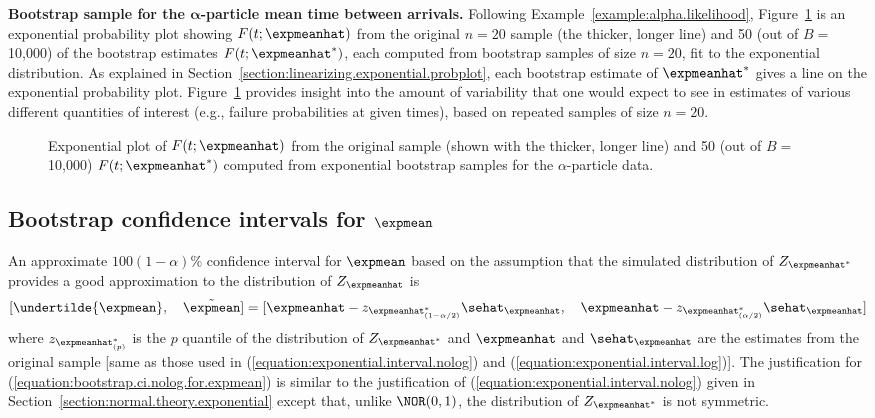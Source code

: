 \begin{example}
{\bf Bootstrap sample for the $\boldsymbol{\alpha}$-particle mean
time between arrivals.} Following
Example~\ref{example:alpha.likelihood},
Figure~\ref{figure:alpha.boot.mleprobplot.ps} is an exponential
probability plot showing $F(t;\expmeanhat)$ from the original $n=20$
sample (the thicker, longer line) and 50 (out of $B=$10,000) of the
bootstrap estimates $F(t;\expmeanhat^{*})$, each computed from
bootstrap samples of size $n=20$, fit to the exponential
distribution. As explained in
Section~\ref{section:linearizing.exponential.probplot}, each
bootstrap estimate of $\expmeanhat^{*}$ gives a line on the
exponential probability
plot. Figure~\ref{figure:alpha.boot.mleprobplot.ps} provides insight
into the amount of variability that one would expect to see in
estimates of various different quantities of interest (e.g., failure
probabilities at given times), based on repeated samples of size
$n=20$.
\end{example}
\begin{figure}
\caption{Exponential plot of $F(t;\expmeanhat)$ from 
the original sample (shown with the thicker, longer line)
and 50 (out of $B=$10,000) $F(t;\expmeanhat^{*})$
computed from exponential bootstrap samples for the $\alpha$-particle
data.}
\label{figure:alpha.boot.mleprobplot.ps}
\end{figure}

\subsection{Bootstrap confidence intervals for $\expmean$ } 
An approximate $100(1-\alpha)\%$ confidence
interval for $\expmean$ based on the assumption that the simulated
distribution of $Z_{\expmeanhat^{*}}$ provides a good approximation to the
distribution of $Z_{\expmeanhat}$ is
\begin{equation}
\label{equation:bootstrap.ci.nolog.for.expmean}
 [\undertilde{\expmean}, \quad \tilde{\expmean}] = [\expmeanhat -
z_{\expmeanhat^{*}_{(1-\alpha/2)}}\sehat_{\expmeanhat},
\quad
\expmeanhat -  z_{\expmeanhat^{*}_{(\alpha/2)}}\sehat_{\expmeanhat}]
\end{equation}
where $z_{\expmeanhat^{*}_{(p)}}$ is the $p$ quantile of
the distribution of $Z_{\expmeanhat^{*}}$ and
$\expmeanhat$ and $\sehat_{\expmeanhat}$ are the estimates from the
original sample [same as those used in
(\ref{equation:exponential.interval.nolog}) 
and (\ref{equation:exponential.interval.log})].
The justification for (\ref{equation:bootstrap.ci.nolog.for.expmean})
is similar to the justification of (\ref{equation:exponential.interval.nolog})
given in Section~\ref{section:normal.theory.exponential}
except that, unlike $\NOR(0,1)$, the distribution
of $Z_{\expmeanhat^{*}}$ is not symmetric.


